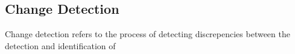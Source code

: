 \subsection{Change Detection}

Change detection refers to the process of detecting discrepencies between  the detection and identification of 